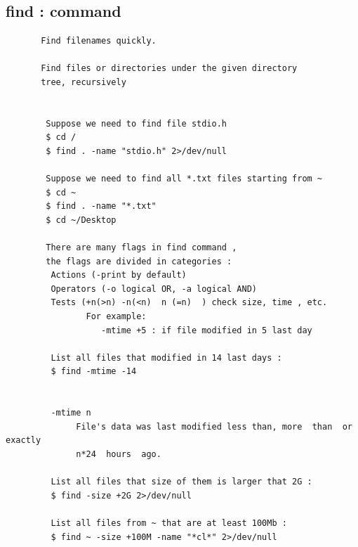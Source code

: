 \documentclass[a4paper,12pt]{article}
\begin{document}
\subsection{find   :  command}
\begin{verbatim}
       Find filenames quickly. 

       Find files or directories under the given directory 
       tree, recursively


        Suppose we need to find file stdio.h
        $ cd /
        $ find . -name "stdio.h" 2>/dev/null
        
        Suppose we need to find all *.txt files starting from ~
        $ cd ~
        $ find . -name "*.txt"
        $ cd ~/Desktop
        
        There are many flags in find command , 
        the flags are divided in categories :
	     Actions (-print by default)
	     Operators (-o logical OR, -a logical AND)
	     Tests (+n(>n) -n(<n)  n (=n)  ) check size, time , etc.
                For example: 
                   -mtime +5 : if file modified in 5 last day

         List all files that modified in 14 last days : 
         $ find -mtime -14

        
         -mtime n
              File's data was last modified less than, more  than  or  exactly
              n*24  hours  ago.
         
         List all files that size of them is larger that 2G :
         $ find -size +2G 2>/dev/null 
         
         List all files from ~ that are at least 100Mb :
         $ find ~ -size +100M -name "*cl*" 2>/dev/null
        
\end{verbatim}
\end{document}

